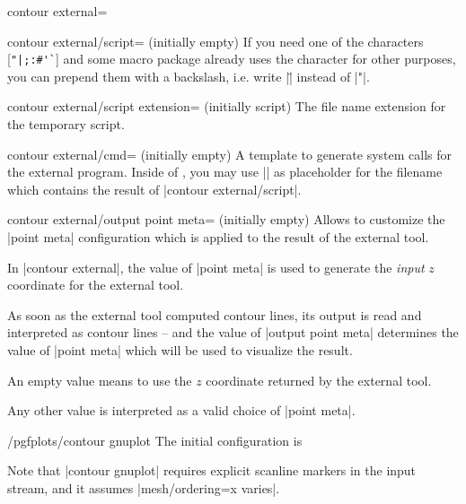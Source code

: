 {{\begin{plottype}[/pgfplots]{contour external=\textcolor{black}{}}
\begin{pgfplotskey}{contour external/script= (initially empty)}
		If you need one of the characters [\verb!"|;:#'`!] and some macro package already uses the character for other purposes, you can prepend them with a backslash, i.e. write |\"| instead of |"|.
	\end{pgfplotskey}

	\begin{pgfplotskey}{contour external/script extension= (initially script)}
		The file name extension for the temporary script.
	\end{pgfplotskey}

	\begin{pgfplotskey}{contour external/cmd= (initially empty)}
		A template to generate system calls for the external program. Inside of , you may use |\script| as placeholder for the filename which contains the result of |contour external/script|.
	\end{pgfplotskey}

	\begin{pgfplotskey}{contour external/output point meta= (initially empty)}
		Allows to customize the |point meta| configuration which is applied to the result of the external tool.

		In |contour external|, the value of |point meta| is used to generate the \emph{input} $z$ coordinate for the external tool.

		As soon as the external tool computed contour lines, its output is read and interpreted as contour lines -- and the value of |output point meta| determines the value of |point meta| which will be used to visualize the result. 

		An empty value means to use the $z$ coordinate returned by the external tool.

		Any other value is interpreted as a valid choice of |point meta|.
	\end{pgfplotskey}

	\begin{stylekey}{/pgfplots/contour gnuplot}
		\label{key:pgfplots:contour:gnuplot}
		The initial configuration is
\begin{codeexample}
\end{codeexample}
	Note that |contour gnuplot| requires explicit scanline markers in the input stream, and it assumes |mesh/ordering=x varies|.
	\end{stylekey}


\end{plottype}}}
